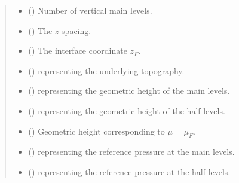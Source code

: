 \documentclass[letterpaper,10pt,english]{sphinxmanual}
\begin{document}
\begin{fulllineitems}
\begin{quote}
\begin{description}
\begin{itemize}
\item {} 
 () \textendash{} Number of vertical main levels.

\item {} 
 () \textendash{} The \(z\)-spacing.

\item {} 
 () \textendash{} The interface coordinate \(z_F\).

\item {} 
{\hyperref[\detokenize{api:module-tasmania.grids.topography}]{}} () \textendash{} {\hyperref[\detokenize{api:tasmania.grids.topography.Topography2d}]{}} representing the underlying topography.

\item {} 
 () \textendash{}  representing the geometric height of the main levels.

\item {} 
 () \textendash{}  representing the geometric height of the half levels.

\item {} 
 () \textendash{} Geometric height corresponding to \(\mu = \mu_F\).

\item {} 
 () \textendash{}  representing the reference pressure at the main levels.

\item {} 
 () \textendash{}  representing the reference pressure at the half levels.


\end{itemize}
\end{description}
\end{quote}
\end{fulllineitems}
\end{document}
